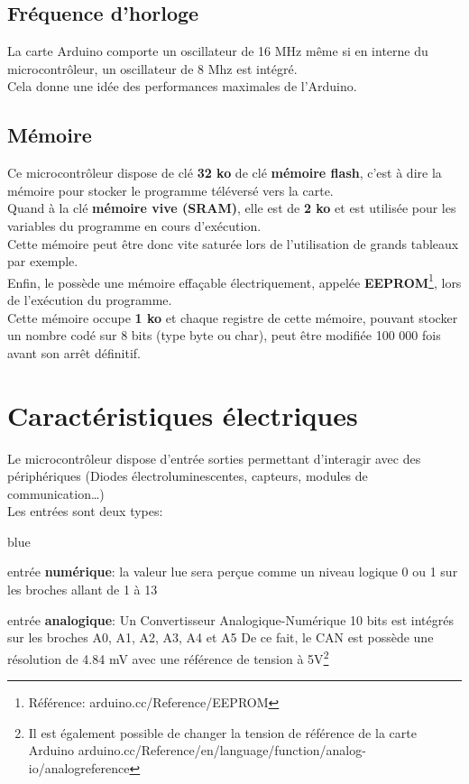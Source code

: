 \subsection{Fréquence d'horloge}

La carte Arduino comporte un oscillateur de 16 MHz même si en interne du microcontrôleur, 
un oscillateur de 8 Mhz est intégré.\\
Cela donne une idée des performances maximales de l'Arduino.



\subsection{Mémoire}

Ce microcontrôleur dispose de clé \textbf{32 ko} de clé \textbf{mémoire flash}, c'est à dire la mémoire 
pour stocker le programme téléversé vers la carte. \\


Quand à la clé \textbf{mémoire vive (SRAM)}, elle est de \textbf{2 ko} et est utilisée pour les 
variables du programme en cours d’exécution. \\
Cette mémoire peut être donc vite saturée lors de l'utilisation de grands tableaux par exemple. \\


Enfin, le  possède une mémoire effaçable électriquement, appelée \textbf{EEPROM}\footnote{Référence: 
arduino.cc/Reference/EEPROM}, lors de l’exécution du programme. \\
Cette mémoire occupe \textbf{1 ko} et chaque registre de cette mémoire, pouvant stocker un nombre 
codé sur 8 bits (type byte ou char), peut être modifiée 100 000 fois avant son arrêt définitif.\\


\section{Caractéristiques électriques}

Le microcontrôleur dispose d'entrée sorties permettant d’interagir avec des périphériques 
(Diodes électroluminescentes, capteurs, modules de communication\ldots) \\

Les entrées sont deux types: 

\begin{items}{blue}{\Triangle}
\item entrée \textbf{numérique}: la valeur lue sera perçue comme un niveau logique 0 ou 1 sur les broches allant de 1 à 13
\item entrée \textbf{analogique}: Un Convertisseur Analogique-Numérique 10 bits est intégrés sur les broches A0, A1, A2, A3, A4 et A5
De ce fait, le CAN  est possède une résolution de 4.84 mV avec une référence de tension à 5V\footnote{Il est également possible de changer la tension de référence de la carte Arduino 
arduino.cc/Reference/en/language/function/analog-io/analogreference}
\end{items}

